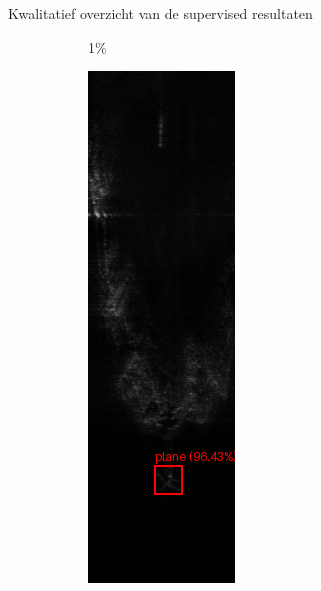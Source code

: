 \documentclass[aspectratio=169]{beamer}
\begin{document}
\begin{frame}{Kwalitatief overzicht van de supervised resultaten}
\begin{figure}
\begin{subfigure}{.15\textwidth}
                \caption[Voorspelling Faster R-CNN 1\%]{1\%}
            \end{subfigure}%
            \hfill
            \begin{subfigure}{.15\textwidth}
                \centering
                \captionsetup{justification=centering}
                \includegraphics[width=0.9\linewidth]{251_faster_rcnn_5pct.png}

\end{subfigure}
\end{figure}
\end{frame}
\end{document}
